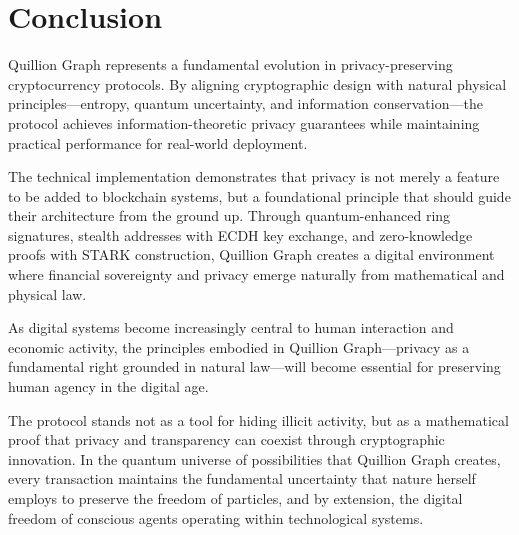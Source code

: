 \documentclass[11pt,a4paper]{article}
\begin{document}
\section{Conclusion}

Quillion Graph represents a fundamental evolution in privacy-preserving cryptocurrency protocols. By aligning cryptographic design with natural physical principles—entropy, quantum uncertainty, and information conservation—the protocol achieves information-theoretic privacy guarantees while maintaining practical performance for real-world deployment.

The technical implementation demonstrates that privacy is not merely a feature to be added to blockchain systems, but a foundational principle that should guide their architecture from the ground up. Through quantum-enhanced ring signatures, stealth addresses with ECDH key exchange, and zero-knowledge proofs with STARK construction, Quillion Graph creates a digital environment where financial sovereignty and privacy emerge naturally from mathematical and physical law.

As digital systems become increasingly central to human interaction and economic activity, the principles embodied in Quillion Graph—privacy as a fundamental right grounded in natural law—will become essential for preserving human agency in the digital age.

The protocol stands not as a tool for hiding illicit activity, but as a mathematical proof that privacy and transparency can coexist through cryptographic innovation. In the quantum universe of possibilities that Quillion Graph creates, every transaction maintains the fundamental uncertainty that nature herself employs to preserve the freedom of particles, and by extension, the digital freedom of conscious agents operating within technological systems.



\end{document}
